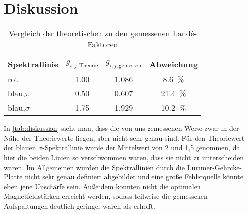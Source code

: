 \section{Diskussion}
\label{sec:Diskussion}

\begin{table}
    \centering
    \caption{Vergleich der theoretischen zu den gemessenen Landé-Faktoren}
    \label{tab:diskussion}
    \begin{tabular}{l S[table-format=1.2] S[table-format=1.3] c}
        \toprule
        Spektrallinie & $g_{i,j,\text{Theorie}}$ & $g_{i,j,\text{gemessen}}$ & Abweichung \\
        \midrule
        rot             & 1.00 & 1.086 & \SI{8.6}{\percent} \\
        blau,$\pi$      & 0.50 & 0.607 & \SI{21.4}{\percent} \\
        blau,$\sigma$   & 1.75 & 1.929 & \SI{10.2}{\percent} \\
        \bottomrule
    \end{tabular}
\end{table}

In \autoref{tab:diskussion} sieht man, dass die von uns gemessenen Werte zwar in der Nähe der Theoriewerte liegen,
aber nicht sehr genau sind.
Für den Theoriewert der blauen $\sigma$-Spektrallinie wurde der Mittelwert von 2 und 1,5 genommen, 
da hier die beiden Linien so verschwommen waren, dass sie nicht zu unterscheiden waren.
Im Allgemeinen wurden die Spektrallinien durch die Lummer-Gehrcke-Platte nicht sehr genau definiert abgebildet
und eine große Fehlerquelle könnte eben jene Unschärfe sein.
Außerdem konnten nicht die optimalen Magnetfeldstärken erreicht werden, 
sodass teilweise die gemessenen Aufspaltungen deutlich geringer waren als erhofft.
